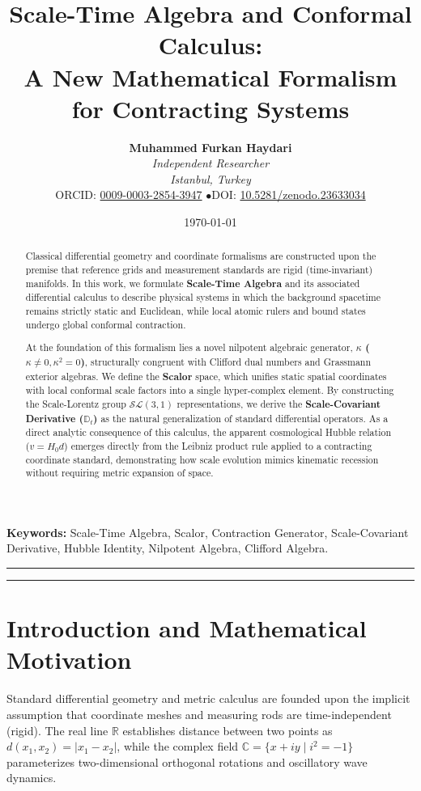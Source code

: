\documentclass[11pt,a4paper]{article}
\title{\textbf{Scale-Time Algebra and Conformal Calculus: \\ A New Mathematical Formalism for Contracting Systems}}
\author{
    \textbf{Muhammed Furkan Haydari} \\
    \textit{Independent Researcher} \\
    \textit{Istanbul, Turkey} \\
    \small ORCID: \href{https://orcid.org/0009-0003-2854-3947}{0009-0003-2854-3947} \quad$\bullet$\quad \small DOI: \href{https://doi.org/10.5281/zenodo.23633034}{10.5281/zenodo.23633034}
}
\date{\today}
\begin{document}
\maketitle

\begin{abstract}
    Classical differential geometry and coordinate formalisms are constructed upon the premise that reference grids and measurement standards are rigid (time-invariant) manifolds. In this work, we formulate \textbf{Scale-Time Algebra} and its associated differential calculus to describe physical systems in which the background spacetime remains strictly static and Euclidean, while local atomic rulers and bound states undergo global conformal contraction.

    At the foundation of this formalism lies a novel nilpotent algebraic generator, \textbf{$\kappa$ ($\kappa \neq 0, \kappa^2 = 0$)}, structurally congruent with Clifford dual numbers and Grassmann exterior algebras. We define the \textbf{Scalor} space, which unifies static spatial coordinates with local conformal scale factors into a single hyper-complex element. By constructing the Scale-Lorentz group $\mathcal{SL}(3,1)$ representations, we derive the \textbf{Scale-Covariant Derivative ($\mathbb{D}_t$)} as the natural generalization of standard differential operators. As a direct analytic consequence of this calculus, the apparent cosmological Hubble relation ($v = H_0 d$) emerges directly from the Leibniz product rule applied to a contracting coordinate standard, demonstrating how scale evolution mimics kinematic recession without requiring metric expansion of space.
\end{abstract}

\vspace{1em}
\noindent\textbf{Keywords:} Scale-Time Algebra, Scalor, Contraction Generator, Scale-Covariant Derivative, Hubble Identity, Nilpotent Algebra, Clifford Algebra.

\vspace{1em}
\hrule
\vspace{0.8em}
\tableofcontents
\vspace{0.8em}
\hrule
\vspace{1.5em}

\section{Introduction and Mathematical Motivation}
\label{sec:giris}

Standard differential geometry and metric calculus are founded upon the implicit assumption that coordinate meshes and measuring rods are time-independent (rigid). The real line $\mathbb{R}$ establishes distance between two points as $d(x_1, x_2) = |x_1 - x_2|$, while the complex field $\mathbb{C} = \{x + i y \mid i^2 = -1\}$ parameterizes two-dimensional orthogonal rotations and oscillatory wave dynamics.
\end{document}
